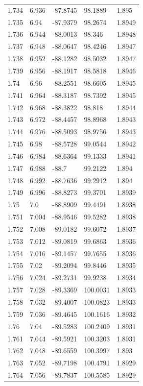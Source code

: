 \begin{tabular}{lllll}
1.734 & 6.936 & -87.8745 & 98.1889 & 1.895 \\
1.735 & 6.94 & -87.9379 & 98.2674 & 1.8949 \\
1.736 & 6.944 & -88.0013 & 98.346 & 1.8948 \\
1.737 & 6.948 & -88.0647 & 98.4246 & 1.8947 \\
1.738 & 6.952 & -88.1282 & 98.5032 & 1.8947 \\
1.739 & 6.956 & -88.1917 & 98.5818 & 1.8946 \\
1.74 & 6.96 & -88.2551 & 98.6605 & 1.8945 \\
1.741 & 6.964 & -88.3187 & 98.7392 & 1.8945 \\
1.742 & 6.968 & -88.3822 & 98.818 & 1.8944 \\
1.743 & 6.972 & -88.4457 & 98.8968 & 1.8943 \\
1.744 & 6.976 & -88.5093 & 98.9756 & 1.8943 \\
1.745 & 6.98 & -88.5728 & 99.0544 & 1.8942 \\
1.746 & 6.984 & -88.6364 & 99.1333 & 1.8941 \\
1.747 & 6.988 & -88.7 & 99.2122 & 1.894 \\
1.748 & 6.992 & -88.7636 & 99.2912 & 1.894 \\
1.749 & 6.996 & -88.8273 & 99.3701 & 1.8939 \\
1.75 & 7.0 & -88.8909 & 99.4491 & 1.8938 \\
1.751 & 7.004 & -88.9546 & 99.5282 & 1.8938 \\
1.752 & 7.008 & -89.0182 & 99.6072 & 1.8937 \\
1.753 & 7.012 & -89.0819 & 99.6863 & 1.8936 \\
1.754 & 7.016 & -89.1457 & 99.7655 & 1.8936 \\
1.755 & 7.02 & -89.2094 & 99.8446 & 1.8935 \\
1.756 & 7.024 & -89.2731 & 99.9238 & 1.8934 \\
1.757 & 7.028 & -89.3369 & 100.0031 & 1.8933 \\
1.758 & 7.032 & -89.4007 & 100.0823 & 1.8933 \\
1.759 & 7.036 & -89.4645 & 100.1616 & 1.8932 \\
1.76 & 7.04 & -89.5283 & 100.2409 & 1.8931 \\
1.761 & 7.044 & -89.5921 & 100.3203 & 1.8931 \\
1.762 & 7.048 & -89.6559 & 100.3997 & 1.893 \\
1.763 & 7.052 & -89.7198 & 100.4791 & 1.8929 \\
1.764 & 7.056 & -89.7837 & 100.5585 & 1.8929 \\

\end{tabular}
